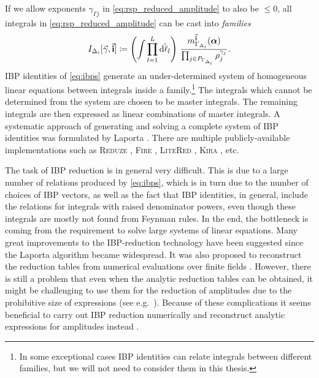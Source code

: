 If we allow exponents $\gamma_{\Gamma j}$ in \cref{eq:rsp_reduced_amplitude} to also be $\leq0$,
all integrals in \cref{eq:rsp_reduced_amplitude} can be cast into \emph{families}
\begin{equation} \label{eq:integral_families}
    I_{\Delta_i}[\va{\gamma},\va{i}] \coloneqq 
  \qty(\int \prod_{l=1}^{L} \tilde{\dd{\ell_l}}) ~  
  \frac{m^{\va{i}}_{\Gamma_{\Delta_i}}(\vb*{\alpha})%
    }{\prod_{j\in P_{\Gamma_{\Delta_i}}} \rho_j^{\gamma_{j}}}.
\end{equation}
IBP identities of \cref{eq:ibps} generate an under-determined system of homogeneous linear equations between integrals inside a family.\footnote{
  In some exceptional cases IBP identities can relate integrals between different families, but we will not need to consider them in this thesis. 
}
The integrals which cannot be determined from the system are chosen to be master integrals.
The remaining integrals are then expressed as linear combinations of master integrals.
A systematic approach of generating and solving a complete system of IBP identities was formulated by Laporta \cite{Laporta:2001dd}.
There are multiple publicly-available implementations such as
\textsc{Reduze} \cite{Studerus:2009ye,vonManteuffel:2012np},
\textsc{Fire} \cite{Smirnov:2008iw,Smirnov:2014hma},
\textsc{LiteRed} \cite{Lee:2012cn,Lee:2013mka},
\textsc{Kira} \cite{Maierhoefer:2017hyi,Maierhofer:2018gpa}, etc.

The task of IBP reduction is in general very difficult.
This is due to a large number of relations produced by \cref{eq:ibps},
which is in turn due to the number of choices of IBP vectors, as well as the fact that IBP identities,
in general, include the relations for integrals with raised denominator powers, even
though these integrals are mostly not found from Feynman rules.
In the end, the bottleneck is coming from the requirement to solve large systems of linear equations.
Many great improvements to the IBP-reduction technology have been suggested
\cite{Gluza:2010ws,Schabinger:2011dz,Larsen:2015ped,Bern:2017gdk,Chawdhry:2018awn,Kosower:2018obg,Mastrolia:2018uzb,Frellesvig:2019kgj,Frellesvig:2019uqt,Bendle2019}
since the Laporta algorithm became widespread.
It was also proposed to reconstruct the reduction tables from
numerical evaluations over finite fields \cite{vonManteuffel:2014ixa,Peraro:2016wsq,Peraro:2019svx,Klappert:2019emp,Smirnov:2019qkx}.
However, there is still a problem
that even when the analytic reduction tables can be obtained,
it might be challenging to use them for the reduction of amplitudes due
to the prohibitive size of expressions (see e.g.\ \cite{Chawdhry:2018awn,Bendle2019}).
Because of these complications it seems beneficial to carry out IBP reduction numerically and reconstruct
analytic expressions for amplitudes instead \cite{Badger:2018enw,Chicherin:2018yne,Badger:2019djh}.

